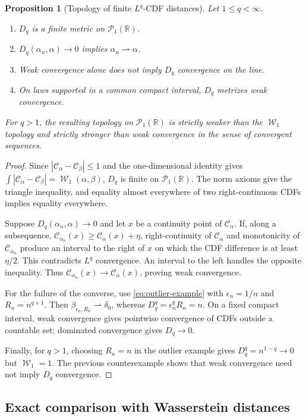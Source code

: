 \documentclass[11pt]{article}
\newtheorem{proposition}[theorem]{Proposition}
\newcommand{\RR}{\mathbb R}
\newcommand{\Pp}{\mathcal P}
\newcommand{\al}{\alpha}
\newcommand{\be}{\beta}
\newcommand{\de}{\delta}
\newcommand{\eps}{\epsilon}
\newcommand{\Cc}{\mathcal C}
\newcommand{\cumul}[1]{\Cc_{#1}}
\DeclareMathOperator{\Wass}{\mathcal W}
\begin{document}
\begin{proposition}[Topology of finite $L^q$-CDF distances]
\label{prop:cdf-lq-topology}
Let $1\leq q<\infty$.
\begin{enumerate}[label=\textnormal{(\roman*)},leftmargin=2.2em]
\item $D_q$ is a finite metric on $\Pp_1(\RR)$.
\item $D_q(\al_n,\al)\to0$ implies
      $\al_n\rightharpoonup\al$.
\item Weak convergence alone does not imply $D_q$ convergence on the line.
\item On laws supported in a common compact interval, $D_q$ metrizes weak
      convergence.
\end{enumerate}
For $q>1$, the resulting topology on $\Pp_1(\RR)$ is strictly weaker than the
$\Wass_1$ topology and strictly stronger than weak convergence in the sense of
convergent sequences.
\end{proposition}

\begin{proof}
Since $|\cumul{\al}-\cumul{\be}|\leq1$ and the one-dimensional identity gives
$\int|\cumul{\al}-\cumul{\be}|=\Wass_1(\al,\be)$, $D_q$ is finite on
$\Pp_1(\RR)$.  The norm axioms give the triangle inequality, and equality
almost everywhere of two right-continuous CDFs implies equality everywhere.

Suppose $D_q(\al_n,\al)\to0$ and let $x$ be a continuity point of
$\cumul{\al}$.  If, along a subsequence,
$\cumul{\al_n}(x)\geq \cumul{\al}(x)+\eta$, right-continuity of $\cumul{\al}$ and
monotonicity of $\cumul{\al_n}$ produce an interval to the right of $x$ on
which the CDF difference is at least $\eta/2$.  This contradicts $L^q$
convergence.  An interval to the left handles the opposite inequality.  Thus
$\cumul{\al_n}(x)\to \cumul{\al}(x)$, proving weak convergence.

For the failure of the converse, use \eqref{eq:outlier-example} with
$\eps_n=1/n$ and $R_n=n^{q+1}$.  Then
$\be_{\eps_n,R_n}\rightharpoonup\de_0$, whereas
$D_q^q=\eps_n^qR_n=n$.  On a fixed compact interval, weak convergence
gives pointwise convergence of CDFs outside a countable set; dominated
convergence gives $D_q\to0$.

Finally, for $q>1$, choosing $R_n=n$ in the outlier example gives
$D_q^q=n^{1-q}\to0$ but $\Wass_1=1$.  The previous counterexample shows that weak
convergence need not imply $D_q$ convergence.
\end{proof}

\subsection{Exact comparison with Wasserstein distances}
\end{document}
